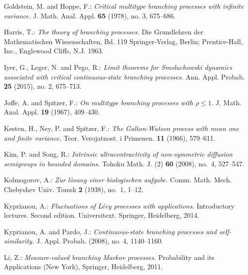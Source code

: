 \documentclass[12pt,a4paper]{amsart}
\def\MR#1{\href{http://www.ams.org/mathscinet-getitem?mr=#1}{MR-#1}}
\theoremstyle{definition}
\numberwithin{equation}{section}
\begin{document}
\begin{thebibliography}{10}
	Goldstein, M. and Hoppe, F.:
	\emph{Critical multitype branching processes with infinite variance.}
	J. Math. Anal. Appl. \textbf{65} (1978), no. 3, 675–686.
	
	Harris, T.:
	\emph{The theory of branching processes.}
	Die Grundlehren der Mathematischen Wissenschaften, Bd. 119 Springer-Verlag, Berlin; Prentice-Hall, Inc., Englewood Cliffs, N.J. 1963.
	
	Iyer, G., Leger, N. and Pego, R.:
	\emph{Limit theorems for Smoluchowski dynamics associated with critical continuous-state branching processes.}
	Ann. Appl. Probab. \textbf{25} (2015), no. 2, 675–713.
	
	Joffe, A. and Spitzer, F.:
	\emph{On multitype branching processes with {$\rho \leq 1$}.}
	J. Math. Anal. Appl. \textbf{19} (1967), 409--430.
	
	Kesten, H., Ney, P. and Spitzer, F.:
	\emph{The {G}alton-{W}atson process with mean one and finite variance.}
	Teor. Verojatnost. i Primenen. \textbf{11} (1966), 579--611.
	
	Kim, P. and Song, R.:
	\emph{Intrinsic ultracontractivity of non-symmetric diffusion semigroups in bounded domains.}
	Tohoku Math. J. (2) \textbf{60} (2008), no.~4, 527--547.
	
	Kolmogorov, A.:
	\emph{Zur l{\"o}sung einer biologischen aufgabe.}
	Comm. Math. Mech. Chebyshev Univ. Tomsk \textbf{2} (1938), no.~1, 1--12.
	
	Kyprianou, A.:
	\emph{Fluctuations of Lévy processes with applications.}
	Introductory lectures. Second edition. Universitext. Springer, Heidelberg, 2014.
	
	Kyprianou, A. and Pardo, J.:
	\emph{Continuous-state branching processes and self-similarity.}
	J. Appl. Probab.  (2008), no. 4, 1140–1160.
  
	Li, Z.:
	\emph{Measure-valued branching {M}arkov processes.}
	Probability and its Applications (New York), Springer, Heidelberg, 2011.
	

\end{thebibliography}
\end{document}
